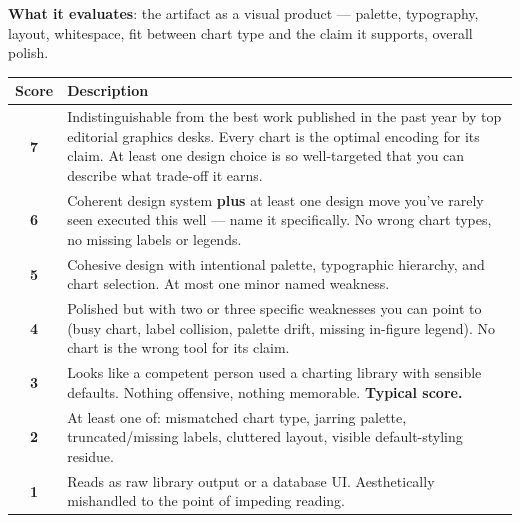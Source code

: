 \begin{tcolorbox}[promptbox, title={Rubric Evaluation scoring guideline}]

\textbf{What it evaluates}: the artifact as a visual product --- palette,
typography, layout, whitespace, fit between chart type and the claim it
supports, overall polish.
\begin{center}
\small
\begin{tabularx}{\linewidth}{cX}
\toprule
Score & Description \\
\midrule
\textbf{7} & Indistinguishable from the best work published in the past year by top editorial graphics desks. Every chart is the optimal encoding for its claim. At least one design choice is so well-targeted that you can describe what trade-off it earns. \\
\textbf{6} & Coherent design system \textbf{plus} at least one design move you've rarely seen executed this well --- name it specifically. No wrong chart types, no missing labels or legends. \\
\textbf{5} & Cohesive design with intentional palette, typographic hierarchy, and chart selection. At most one minor named weakness. \\
\textbf{4} & Polished but with two or three specific weaknesses you can point to (busy chart, label collision, palette drift, missing in-figure legend). No chart is the wrong tool for its claim. \\
\textbf{3} & Looks like a competent person used a charting library with sensible defaults. Nothing offensive, nothing memorable. \textbf{Typical score.} \\
\textbf{2} & At least one of: mismatched chart type, jarring palette, truncated/missing labels, cluttered layout, visible default-styling residue. \\
\textbf{1} & Reads as raw library output or a database UI. Aesthetically mishandled to the point of impeding reading. \\
\bottomrule
\end{tabularx}
\end{center}


\end{tcolorbox}
